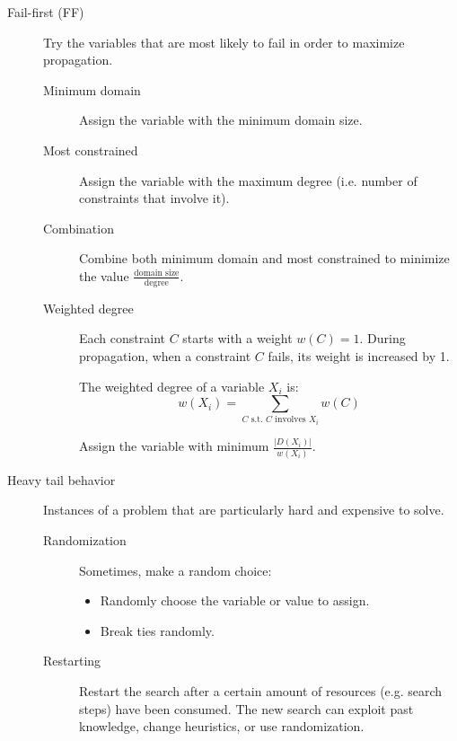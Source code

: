 \begin{description}
    \item[Fail-first (FF)] 
        Try the variables that are most likely to fail in order to maximize propagation.
        \begin{description}
            \item[Minimum domain]
                Assign the variable with the minimum domain size.

            \item[Most constrained]
                Assign the variable with the maximum degree (i.e. number of constraints that involve it).

            \item[Combination] 
                Combine both minimum domain and most constrained to minimize the value $\frac{\text{domain size}}{\text{degree}}$.
        
            \item[Weighted degree]
                Each constraint $C$ starts with a weight $w(C) = 1$.
                During propagation, when a constraint $C$ fails, its weight is increased by 1.

                The weighted degree of a variable $X_i$ is:
                \[ w(X_i) = \sum_{\text{$C$ s.t. $C$ involves $X_i$}} w(C) \]

                Assign the variable with minimum $\frac{\vert D(X_i) \vert}{w(X_i)}$.
        \end{description}


    \item[Heavy tail behavior]
        Instances of a problem that are particularly hard and expensive to solve.

        \begin{description}
            \item[Randomization]
                Sometimes, make a random choice:
                \begin{itemize}
                    \item Randomly choose the variable or value to assign.
                    \item Break ties randomly.
                \end{itemize}

            \item[Restarting]
                Restart the search after a certain amount of resources (e.g. search steps) have been consumed.
                The new search can exploit past knowledge, change heuristics, or use randomization.


\end{description}
\end{description}
